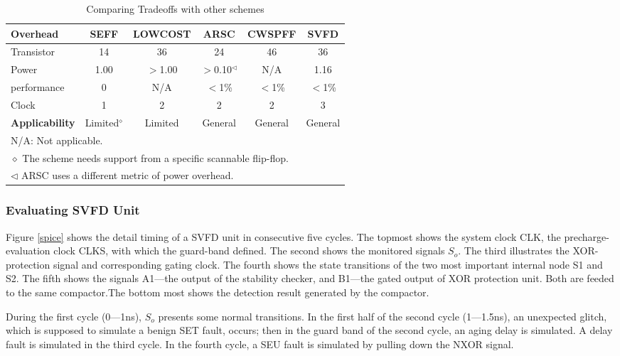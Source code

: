 \begin{table}[t]
\begin{center}
\caption{Comparing Tradeoffs with other schemes}\label{comparison1}
\begin{tabular}{l||ccccc}
 {\bf Overhead}     &  SEFF\cite{Mitra_C05}  &  LOWCOST\cite{lowcost_date07} &  ARSC\cite{failure_prediction_07}  &  CWSPFF\cite{CWSP_DATE08}    &  SVFD \\
\hline
Transistor          & 14     & 36       & 24     & 46       &  36   \\
Power               & 1.00      & $>$1.00        & $>$0.10$^\triangleleft$   &  N/A     &  1.16  \\
performance         & 0      & N/A      & $<$1\% & $<$1\%   &  $<$1\%\\
Clock               & 1      &  2       &  2     & 2        &  3    \\
\hline
\hline
  {\bf Applicability}     & Limited$^\diamond$ & Limited &  General & General & General \\
\hline \multicolumn{6}{l}{N/A:  Not applicable.}\\
\multicolumn{6}{l}{$\diamond$  The scheme needs support from a specific scannable flip-flop.}\\
\multicolumn{6}{l}{$\triangleleft$  ARSC uses a different metric of power overhead.} \\

\end{tabular}
\end{center}
\end{table}


\subsubsection{Evaluating SVFD Unit}
Figure \ref{spice} shows the detail timing of a SVFD unit in consecutive five cycles. The topmost shows the system clock CLK, the precharge-evaluation clock CLKS, with which the guard-band defined. The second shows the monitored signals $S_o$. The third illustrates the XOR-protection signal and corresponding gating clock. The fourth shows the state transitions of the two most important internal node S1 and S2. The fifth shows the signals A1---the output of the stability checker, and B1---the gated output of XOR protection unit. Both are feeded to the same compactor.The bottom most shows the detection result generated by the compactor.

During the first cycle (0---1ns), $S_o$ presents some normal transitions. In the first half of the second cycle (1---1.5ns), an unexpected glitch, which is supposed to simulate a benign SET fault, occurs; then in the guard band of the second cycle, an aging delay is simulated. A delay fault is simulated in the third cycle. In the fourth cycle, a SEU fault is simulated by pulling down the NXOR signal.


